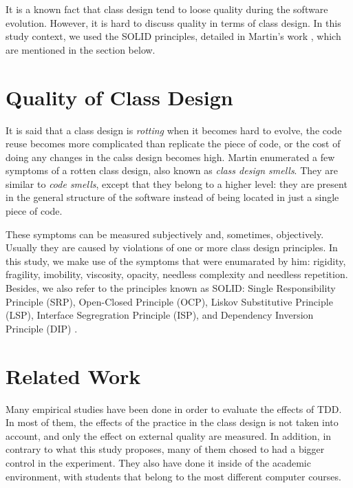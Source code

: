 \documentclass[conference]{IEEEtran}
\begin{document}
It is a known fact that class design tend to loose quality during the software evolution.
However, it is hard to discuss quality in terms of class design. In this study context,
we used the SOLID principles, detailed in Martin's work \cite{bob-martin}, which are
mentioned in the section below.

\section{Quality of Class Design}

It is said that a class design is \textit{rotting} when it becomes hard
to evolve, the code reuse becomes more complicated than replicate the piece
of code, or the cost of doing any changes in the calss design becomes high.
Martin \cite{bob-martin} enumerated a few symptoms of a rotten class design,
also known as \textit{class design smells}. They are similar to \textit{code smells},
except that they belong to a higher level: they are present in the general structure
of the software instead of being located in just a single piece of code.

These symptoms can be measured subjectively and, sometimes, objectively. Usually
they are caused by violations of one or more class design principles.
In this study, we make use of the symptoms that were enumarated by him: 
rigidity, fragility, imobility, viscosity, opacity, needless complexity and
needless repetition. Besides, we also refer to the principles known as SOLID:
Single Responsibility Principle (SRP), Open-Closed Principle (OCP),
Liskov Substitutive Principle (LSP), Interface Segregration Principle (ISP), and
Dependency Inversion Principle (DIP) \cite{bob-martin}.

\section{Related Work}
\label{cap:trabalhos-relacionados}

Many empirical studies have been done in order to evaluate the effects of TDD.
In most of them, the effects of the practice in the class design is not taken
into account, and only the effect on external quality are measured. In addition,
in contrary to what this study proposes, many of them chosed
to had a bigger control in the experiment. They also have done it inside of the academic
environment, with students that belong to the most different computer courses.
\end{document}
